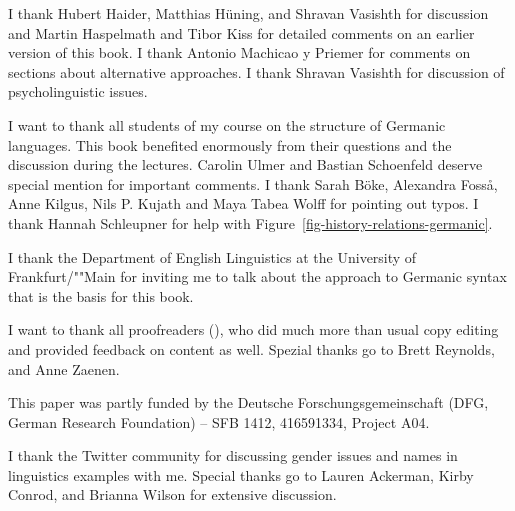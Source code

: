 \addchap{\lsAcknowledgementTitle} 

I thank Hubert Haider, Matthias Hüning, and Shravan Vasishth for discussion and Martin Haspelmath and Tibor Kiss for detailed comments
on an earlier version of this book. I thank Antonio Machicao y Priemer for comments on sections
about alternative approaches. I thank Shravan Vasishth for discussion of psycholinguistic issues.

I want to thank all students of my course on the structure of Germanic languages. This book
benefited enormously from their questions and the discussion during the lectures. 
Carolin Ulmer %
and
Bastian Schoenfeld %
deserve special mention for important comments. I thank 
Sarah Böke,
Alexandra Fosså,
Anne Kilgus,
Nils P. Kujath
and 
Maya Tabea Wolff  
for pointing out typos. I thank Hannah Schleupner for help with Figure~\ref{fig-history-relations-germanic}.

I thank the Department of English Linguistics at the University of Frankfurt/""Main for inviting me to
talk about the approach to Germanic syntax that is the basis for this book.

I want to thank all proofreaders (\makeatletter\@proofreader\makeatother), who did much more than
usual copy editing and provided feedback on 
content as well.  Spezial thanks go to Brett Reynolds, and Anne Zaenen.

This paper was partly funded by the Deutsche Forschungsgemeinschaft (DFG, German Research Foundation) – SFB 1412, 416591334, Project A04.

I thank the Twitter community for discussing gender issues and names in linguistics examples with
me. Special thanks go to Lauren Ackerman, Kirby Conrod, and Brianna Wilson for extensive discussion.





